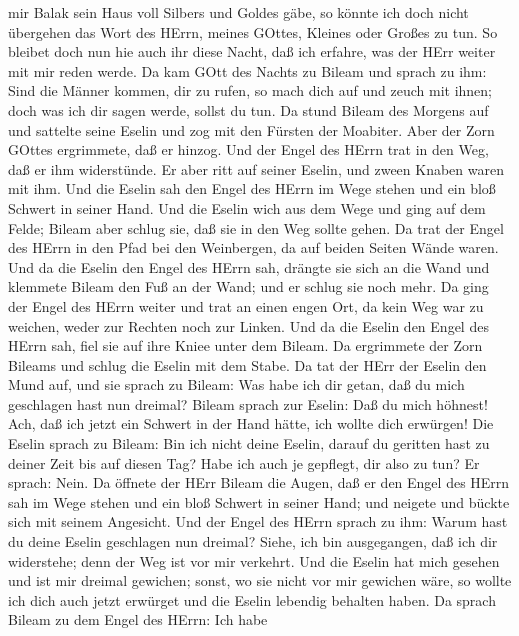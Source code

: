 mir Balak sein Haus voll Silbers und Goldes gäbe, so könnte ich doch
nicht übergehen das Wort des HErrn, meines GOttes, Kleines oder Großes
zu tun.  So bleibet doch nun hie auch ihr diese Nacht, daß
ich erfahre, was der HErr weiter mit mir reden werde.  Da
kam GOtt des Nachts zu Bileam und sprach zu ihm: Sind die Männer kommen,
dir zu rufen, so mach dich auf und zeuch mit ihnen; doch was ich dir
sagen werde, sollst du tun.  Da stund Bileam des Morgens
auf und sattelte seine Eselin und zog mit den Fürsten der Moabiter.
 Aber der Zorn GOttes ergrimmete, daß er hinzog. Und der
Engel des HErrn trat in den Weg, daß er ihm widerstünde. Er aber ritt
auf seiner Eselin, und zween Knaben waren mit ihm.  Und die
Eselin sah den Engel des HErrn im Wege stehen und ein bloß Schwert in
seiner Hand. Und die Eselin wich aus dem Wege und ging auf dem Felde;
Bileam aber schlug sie, daß sie in den Weg sollte gehen. 
Da trat der Engel des HErrn in den Pfad bei den Weinbergen, da auf
beiden Seiten Wände waren.  Und da die Eselin den Engel des
HErrn sah, drängte sie sich an die Wand und klemmete Bileam den Fuß an
der Wand; und er schlug sie noch mehr.  Da ging der Engel
des HErrn weiter und trat an einen engen Ort, da kein Weg war zu
weichen, weder zur Rechten noch zur Linken.  Und da die
Eselin den Engel des HErrn sah, fiel sie auf ihre Kniee unter dem
Bileam. Da ergrimmete der Zorn Bileams und schlug die Eselin mit dem
Stabe.  Da tat der HErr der Eselin den Mund auf, und sie
sprach zu Bileam: Was habe ich dir getan, daß du mich geschlagen hast
nun dreimal?  Bileam sprach zur Eselin: Daß du mich
höhnest! Ach, daß ich jetzt ein Schwert in der Hand hätte, ich wollte
dich erwürgen!  Die Eselin sprach zu Bileam: Bin ich nicht
deine Eselin, darauf du geritten hast zu deiner Zeit bis auf diesen Tag?
Habe ich auch je gepflegt, dir also zu tun? Er sprach: Nein.
 Da öffnete der HErr Bileam die Augen, daß er den Engel des
HErrn sah im Wege stehen und ein bloß Schwert in seiner Hand; und
neigete und bückte sich mit seinem Angesicht.  Und der
Engel des HErrn sprach zu ihm: Warum hast du deine Eselin geschlagen nun
dreimal? Siehe, ich bin ausgegangen, daß ich dir widerstehe; denn der
Weg ist vor mir verkehrt.  Und die Eselin hat mich gesehen
und ist mir dreimal gewichen; sonst, wo sie nicht vor mir gewichen wäre,
so wollte ich dich auch jetzt erwürget und die Eselin lebendig behalten
haben.  Da sprach Bileam zu dem Engel des HErrn: Ich habe
